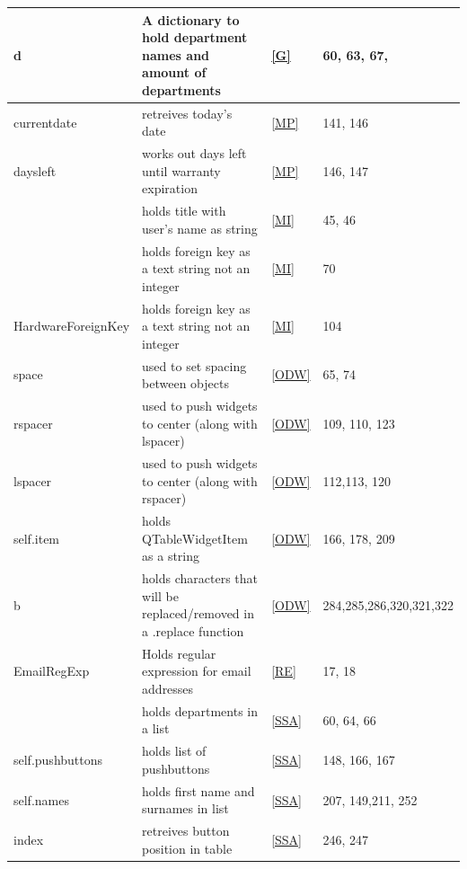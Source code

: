 \begin{center}
\begin{longtable}{|p{4cm}|p{3cm}|p{2cm}|p{3cm}|}
d & A dictionary to hold department names and amount of departments& \ref{G} & 60, 63, 67,  \\ \hline 

currentdate & retreives today's date& \ref{MP} & 141, 146  \\ \hline
daysleft & works out days left until warranty expiration& \ref{MP} & 146, 147  \\ \hline

\verb name_lbl & holds title with user's name as string& \ref{MI} & 45, 46  \\ \hline
\verb Foreign_Item & holds foreign key as a text string not an integer & \ref{MI} & 70\\ \hline
HardwareForeignKey & holds foreign key as a text string not an integer & \ref{MI} & 104 \\ \hline

space & used to set spacing between objects& \ref{ODW} & 65, 74  \\ \hline
rspacer & used to push widgets to center (along with lspacer)& \ref{ODW} & 109, 110, 123 \\ \hline
lspacer & used to push widgets to center (along with rspacer)& \ref{ODW} & 112,113, 120 \\ \hline
self.item & holds QTableWidgetItem as a string & \ref{ODW} & 166, 178, 209 \\ \hline
b &holds characters that will be replaced/removed in a .replace function& \ref{ODW} &284,285,286,320,321,322 \\ \hline

EmailRegExp & Holds regular expression for email addresses& \ref{RE} & 17, 18  \\ \hline

\verb field_names & holds departments in a list& \ref{SSA} &  60, 64, 66  \\ \hline
self.pushbuttons & holds list of pushbuttons & \ref{SSA} & 148, 166, 167\\ \hline
self.names & holds first name and surnames in list& \ref{SSA} & 207, 149,211, 252  \\ \hline
index & retreives button position in table& \ref{SSA} & 246, 247 \\ \hline









\end{longtable}
\end{center}

